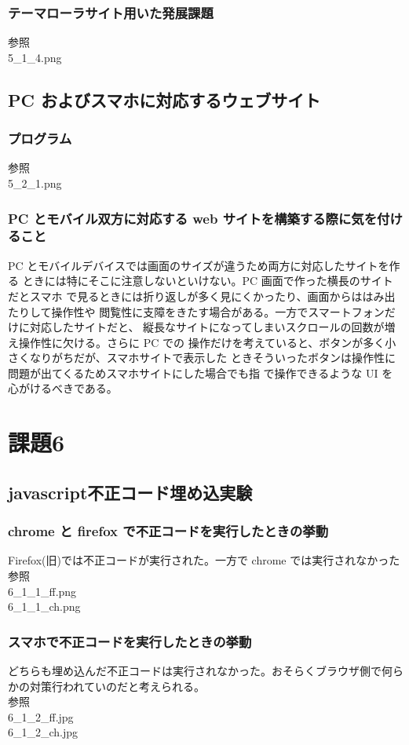 \documentclass[a4j]{jarticle}
\begin{document}
      \subsubsection{テーマローラサイト用いた発展課題}
        参照\\
        5\_1\_4.png
    \subsection{PC およびスマホに対応するウェブサイト}
      \subsubsection{プログラム}
        参照\\
        5\_2\_1.png
      \subsubsection{PC とモバイル双方に対応する web サイトを構築する際に気を付けること}
            PC とモバイルデバイスでは画面のサイズが違うため両方に対応したサイトを作る
        ときには特にそこに注意しないといけない。PC 画面で作った横長のサイトだとスマホ
        で見るときには折り返しが多く見にくかったり、画面からははみ出たりして操作性や
        閲覧性に支障をきたす場合がある。一方でスマートフォンだけに対応したサイトだと、
        縦長なサイトになってしまいスクロールの回数が増え操作性に欠ける。さらに PC での
        操作だけを考えていると、ボタンが多く小さくなりがちだが、スマホサイトで表示した
        ときそういったボタンは操作性に問題が出てくるためスマホサイトにした場合でも指
        で操作できるような UI を心がけるべきである。
  \section{課題6}
    \subsection{javascript不正コード埋め込実験}
      \subsubsection{chrome と firefox で不正コードを実行したときの挙動}
        Firefox(旧)では不正コードが実行された。一方で chrome では実行されなかった\\
        参照\\
        6\_1\_1\_ff.png\\
        6\_1\_1\_ch.png
      \subsubsection{スマホで不正コードを実行したときの挙動}
        どちらも埋め込んだ不正コードは実行されなかった。おそらくブラウザ側で何らかの対策行われていのだと考えられる。\\
        参照\\
        6\_1\_2\_ff.jpg\\
        6\_1\_2\_ch.jpg
\end{document}
